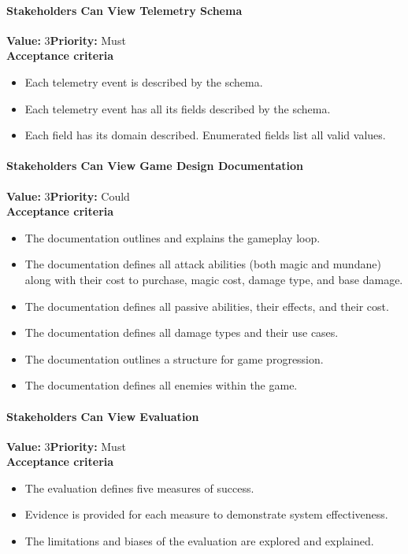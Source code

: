 \paragraph{Stakeholders Can View Telemetry Schema}
\textbf{Value:} 3\quad \textbf{Priority:} Must\\
\textbf{Acceptance criteria}
\begin{itemize}
  \item Each telemetry event is described by the schema.
  \item Each telemetry event has all its fields described by the schema.
  \item Each field has its domain described. Enumerated fields list all valid values.
\end{itemize}

\paragraph{Stakeholders Can View Game Design Documentation}
\textbf{Value:} 3\quad \textbf{Priority:} Could\\
\textbf{Acceptance criteria}
\begin{itemize}
  \item The documentation outlines and explains the gameplay loop.
  \item The documentation defines all attack abilities (both magic and mundane) along with their cost to purchase, magic cost, damage type, and base damage.
  \item The documentation defines all passive abilities, their effects, and their cost.
  \item The documentation defines all damage types and their use cases.
  \item The documentation outlines a structure for game progression.
  \item The documentation defines all enemies within the game.
\end{itemize}

\paragraph{Stakeholders Can View Evaluation}
\textbf{Value:} 3\quad \textbf{Priority:} Must\\
\textbf{Acceptance criteria}
\begin{itemize}
  \item The evaluation defines five measures of success.
  \item Evidence is provided for each measure to demonstrate system effectiveness.
  \item The limitations and biases of the evaluation are explored and explained.
\end{itemize}
